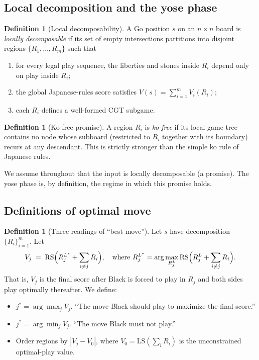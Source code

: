 \documentclass[11pt,a4paper]{amsart}
\theoremstyle{definition}
\newtheorem{definition}[theorem]{Definition}
\theoremstyle{remark}
\newcommand{\LS}{\mathrm{LS}}
\newcommand{\RS}{\mathrm{RS}}
\begin{document}
\subsection{Local decomposition and the yose phase}

\begin{definition}[Local decomposability]\label{def:decomp}
A Go position $s$ on an $n \times n$ board is \emph{locally decomposable}
if its set of empty intersections partitions into disjoint regions
$\{R_1, \ldots, R_m\}$ such that
\begin{enumerate}[label=(\roman*)]
\item for every legal play sequence, the liberties and stones inside
  $R_i$ depend only on play inside $R_i$;
\item the global Japanese-rules score satisfies
  $V(s) = \sum_{i=1}^m V_i(R_i)$;
\item each $R_i$ defines a well-formed CGT subgame.
\end{enumerate}
\end{definition}

\begin{definition}[Ko-free promise]\label{def:kofree}
A region $R_i$ is \emph{ko-free} if its local game tree contains no node
whose subboard (restricted to $R_i$ together with its boundary) recurs at
any descendant. This is strictly stronger than the simple ko rule of
Japanese rules.
\end{definition}

We assume throughout that the input is locally decomposable (a promise).
The yose phase is, by definition, the regime in which this promise holds.

\subsection{Definitions of optimal move}

\begin{definition}[Three readings of ``best
move'']\label{def:Dreadings}
Let $s$ have decomposition $\{R_i\}_{i=1}^m$. Let
\[
  V_j \;=\; \RS\Bigl( R_j^{L^*} + \sum_{i \neq j} R_i \Bigr),
  \quad\text{where } R_j^{L^*}
  = \arg\max_{R_j^L} \RS\Bigl( R_j^L + \sum_{i \neq j} R_i \Bigr).
\]
That is, $V_j$ is the final score after Black is forced to play in $R_j$
and both sides play optimally thereafter. We define:
\begin{itemize}[leftmargin=2em]
\item[$(D\text{-must})$] $j^* = \arg\max_j V_j$. ``The move Black should
  play to maximize the final score.''
\item[$(D\text{-avoid})$] $j^* = \arg\min_j V_j$. ``The move Black must
  not play.''
\item[$(D\text{-sign})$] Order regions by $|V_j - V_0|$, where
  $V_0 = \LS(\sum_i R_i)$ is the unconstrained optimal-play value.
\end{itemize}
\end{definition}
\end{document}
